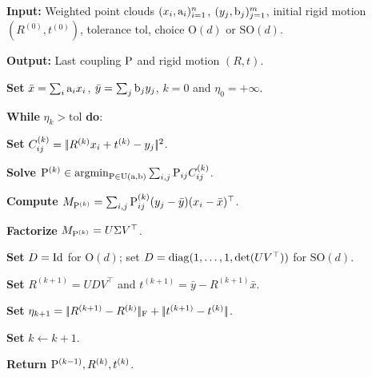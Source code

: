 \begin{alg}\label{alg:wasserstein-procrustes}
\textbf{Input:} Weighted point clouds $(x_i,\a_i)_{i=1}^n$, $(y_j,\b_j)_{j=1}^m$, initial rigid motion $(R^{(0)},t^{(0)})$, tolerance $\mathrm{tol}$, choice $\mathrm O(d)$ or $\mathrm{SO}(d)$.

\textbf{Output:} Last coupling $\P$ and rigid motion $(R,t)$.

\textbf{Set} $\bar x=\sum_i\a_i x_i$, $\bar y=\sum_j\b_j y_j$, $k=0$ and $\eta_0=+\infty$.

\textbf{While} $\eta_k>\mathrm{tol}$ \textbf{do}:
\begin{algblock}

\textbf{Set} \(C_{ij}^{(k)}=\norm{R^{(k)}x_i+t^{(k)}-y_j}^2\).

\textbf{Solve} \(\P^{(k)}\in\argmin_{\P\in\CouplingsD(\a,\b)}\sum_{i,j}\P_{ij}C_{ij}^{(k)}\).

\textbf{Compute} \(M_{\P^{(k)}}=\sum_{i,j}\P^{(k)}_{ij}(y_j-\bar y)(x_i-\bar x)^\top\).

\textbf{Factorize} \(M_{\P^{(k)}}=U\Sigma V^\top\).

\textbf{Set} \(D=\Id\) for $\mathrm O(d)$; set \(D=\diag(1,\ldots,1,\det(UV^\top))\) for $\mathrm{SO}(d)$.

\textbf{Set} \(R^{(k+1)}=UDV^\top\) and \(t^{(k+1)}=\bar y-R^{(k+1)}\bar x\).

\textbf{Set} \(\eta_{k+1}=\norm{R^{(k+1)}-R^{(k)}}_{\mathrm F}+\norm{t^{(k+1)}-t^{(k)}}\).

\textbf{Set} \(k\leftarrow k+1\).
\end{algblock}
\algreturnskip
\textbf{Return} \(\P^{(k-1)},R^{(k)},t^{(k)}\).
\end{alg}

